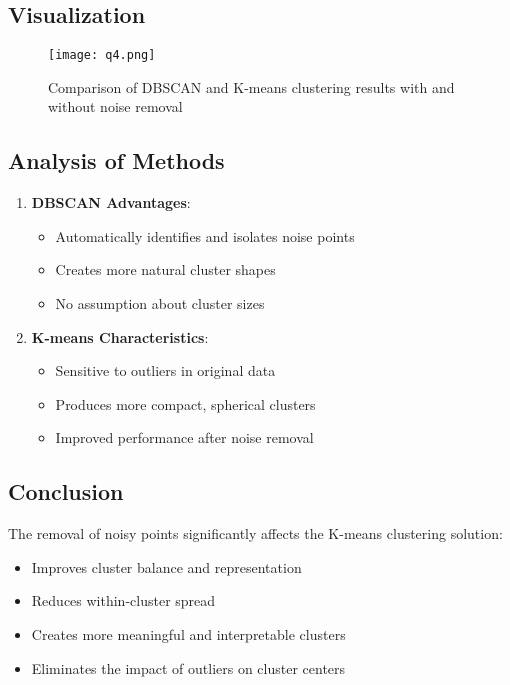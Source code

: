 \documentclass[12pt]{article}
\begin{document}
\subsection{Visualization}

\begin{figure}[H]
    \centering
    \texttt{[image: q4.png]}
    \caption{Comparison of DBSCAN and K-means clustering results with and without noise removal}
\end{figure}
\subsection{Analysis of Methods}
\begin{enumerate}
    \item \textbf{DBSCAN Advantages}:
    \begin{itemize}
        \item Automatically identifies and isolates noise points
        \item Creates more natural cluster shapes
        \item No assumption about cluster sizes
    \end{itemize}
    
    \item \textbf{K-means Characteristics}:
    \begin{itemize}
        \item Sensitive to outliers in original data
        \item Produces more compact, spherical clusters
        \item Improved performance after noise removal
    \end{itemize}
\end{enumerate}

\subsection{Conclusion}
The removal of noisy points significantly affects the K-means clustering solution:
\begin{itemize}
    \item Improves cluster balance and representation
    \item Reduces within-cluster spread
    \item Creates more meaningful and interpretable clusters
    \item Eliminates the impact of outliers on cluster centers
\end{itemize}
\end{document}
